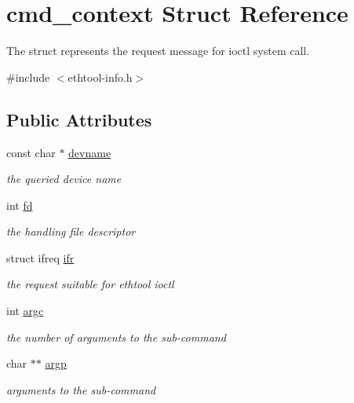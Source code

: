 \hypertarget{structcmd__context}{}\section{cmd\+\_\+context Struct Reference}
\label{structcmd__context}


The struct represents the request message for ioctl system call.  




{\ttfamily \#include $<$ethtool-\/info.\+h$>$}

\subsection*{Public Attributes}
\begin{DoxyCompactItemize}
\item 
const char $\ast$ \hyperlink{structcmd__context_ab8b7bd55de702a0928b0d27b7d7f46c4}{devname}
\begin{DoxyCompactList}\small\item\em the queried device name \end{DoxyCompactList}\item 
int \hyperlink{structcmd__context_a3482941a7d95d94958fd026e984aaad6}{fd}
\begin{DoxyCompactList}\small\item\em the handling file descriptor \end{DoxyCompactList}\item 
struct ifreq \hyperlink{structcmd__context_a372549b7e45b707f07780719bc9f3b06}{ifr}
\begin{DoxyCompactList}\small\item\em the request suitable for ethtool ioctl \end{DoxyCompactList}\item 
int \hyperlink{structcmd__context_a1aa1c9bed1f38cff4fd629b65a8cbca9}{argc}
\begin{DoxyCompactList}\small\item\em the number of arguments to the sub-\/command \end{DoxyCompactList}\item 
char $\ast$$\ast$ \hyperlink{structcmd__context_a24ef49bb73e5c7212d3277860adce333}{argp}
\begin{DoxyCompactList}\small\item\em arguments to the sub-\/command \end{DoxyCompactList}\end{DoxyCompactItemize}


